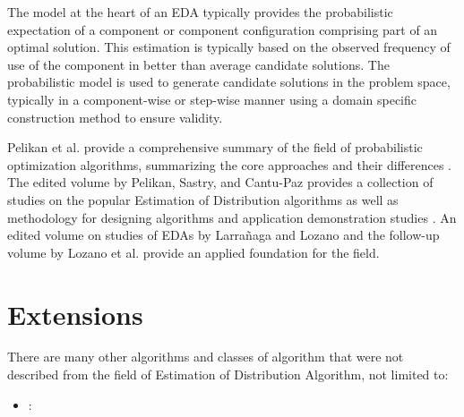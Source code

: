 \begin{bibunit}
The model at the heart of an EDA typically provides the probabilistic expectation of a component or component configuration comprising part of an optimal solution. This estimation is typically based on the observed frequency of use of the component in better than average candidate solutions. The probabilistic model is used to generate candidate solutions in the problem space, typically in a component-wise or step-wise manner using a domain specific construction method to ensure validity.

Pelikan et al. provide a comprehensive summary of the field of probabilistic optimization algorithms, summarizing the core approaches and their differences \cite{Pelikan2002b}.
The edited volume by Pelikan, Sastry, and Cantu-Paz provides a collection of studies on the popular Estimation of Distribution algorithms as well as methodology for designing algorithms and application demonstration studies \cite{Pelikan2006}.
An edited volume on studies of EDAs by Larrañaga and Lozano \cite{Larranaga2002} and the follow-up volume by Lozano et al. \cite{Lozano2006} provide an applied foundation for the field.

% 
% 
\section{Extensions}
There are many other algorithms and classes of algorithm that were not described from the field of Estimation of Distribution Algorithm, not limited to:

\begin{itemize}
	\item \textbf{}:
\end{itemize}


\end{bibunit}
